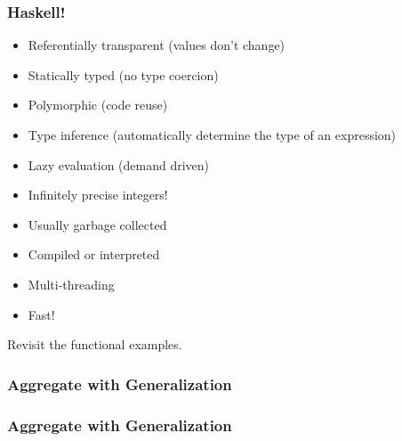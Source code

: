 \begin{frame}
  \frametitle{Haskell!}
  \pause
  \begin{itemize}[<+->]
    \item Referentially transparent (values don't change)
    \item Statically typed (no type coercion)
    \item Polymorphic (code reuse)
    \item Type inference (automatically determine the type of an expression)
    \item Lazy evaluation (demand driven)
    \item Infinitely precise integers!
    \item Usually garbage collected
    \item Compiled or interpreted
    \item Multi-threading
    \item Fast!
  \end{itemize}
\end{frame}



\begin{frame}
  Revisit the functional examples.
\end{frame}

\begin{frame}[fragile]
  \frametitle{Aggregate with Generalization}
  \pause
  
\end{frame}

\begin{frame}[fragile]
  \frametitle{Aggregate with Generalization}
  \pause
  
\end{frame}
